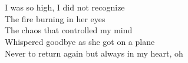 \\
 \\
I was so high, I did not recognize \\
The fire burning in her eyes \\
The chaos that controlled my mind \\
Whispered goodbye as she got on a plane \\
Never to return again but always in my heart, oh
